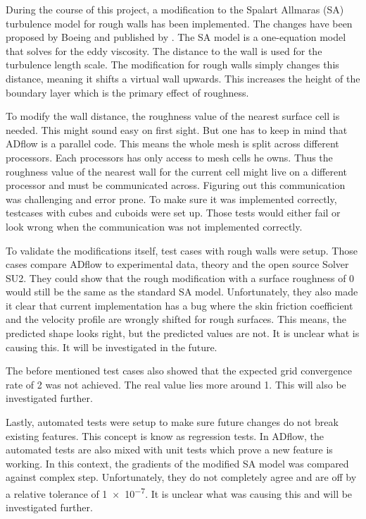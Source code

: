 During the course of this project, a modification to the Spalart Allmaras (SA)
turbulence model for rough walls has been implemented. The changes have been
proposed by Boeing and published by \cite{sa_rough}. The SA model is a
one-equation model that solves for the eddy viscosity. The distance to the wall
is used for the turbulence length scale. The modification for rough walls simply
changes this distance, meaning it shifts a virtual wall upwards. This increases
the height of the boundary layer which is the primary effect of roughness.

To modify the wall distance, the roughness value of the nearest surface cell is
needed. This might sound easy on first sight. But one has to keep in mind that
ADflow is a parallel code. This means the whole mesh is split across different
processors. Each processors has only access to mesh cells he owns. Thus the
roughness value of the nearest wall for the current cell might live on a
different processor and must be communicated across. Figuring out this
communication was challenging and error prone. To make sure it was implemented
correctly, testcases with cubes and cuboids were set up. Those tests would
either fail or look wrong when the communication was not implemented correctly.

To validate the modifications itself, test cases with rough walls were setup.
Those cases compare ADflow to experimental data, theory and the open source
Solver SU2. They could show that the rough modification with a surface roughness
of 0 would still be the same as the standard SA model. Unfortunately, they also
made it clear that current implementation has a bug where the skin friction
coefficient and the velocity profile are wrongly shifted for rough surfaces.
This means, the predicted shape looks right, but the predicted values are not.
It is unclear what is causing this. It will be investigated in the future.

The before mentioned test cases also showed that the expected grid convergence
rate of 2 was not achieved. The real value lies more around 1. This will also be
investigated further.

Lastly, automated tests were setup to make sure future changes do not break
existing features. This concept is know as regression tests. In ADflow, the
automated tests are also mixed with unit tests which prove a new feature is
working. In this context, the gradients of the modified SA model was compared
against complex step. Unfortunately, they do not completely agree and are off by
a relative tolerance of \num{1e-7}. It is unclear what was causing this and will
be investigated further.

